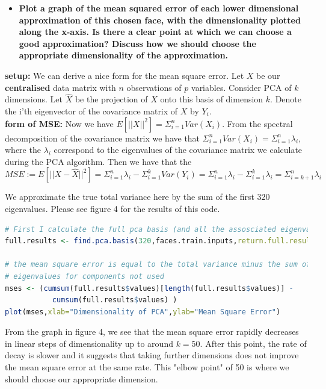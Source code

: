 \documentclass[11pt]{article}
\begin{document}
\begin{itemize}
\item \textbf{Plot a graph of the mean squared error of each lower dimensional approximation of this chosen face, with the dimensionality plotted along the x-axis. Is there a clear point at which we can choose a good approximation? Discuss how we should choose the appropriate dimensionality of the approximation.}
\end{itemize}
\textbf{setup:}
We can derive a nice form for the mean square error. Let $X$ be our \textbf{centralised} data matrix with $n$ observations of $p$ variables. Consider PCA of $k$ dimensions. Let $\hat{X}$ be the projection of $X$ onto this basis of dimension $k$. Denote the i'th eigenvector of the covariance matrix of $X$ by $Y_{i}$. \\
\textbf{form of MSE:}
Now we have $E[||X||^{2}] = \Sigma_{i=1}^{n} Var(X_{i})$. From the spectral decomposition of the covariance matrix we have that $\Sigma_{i=1}^{n} Var(X_{i}) = \Sigma_{i=1}^{n} \lambda_{i}$, where the $\lambda_{i}$ correspond to the eigenvalues of the covariance matrix we calculate during the PCA algorithm. Then we have that the $MSE := E[||X - \hat{X}  ||^{2}] = \Sigma_{i=1}^{n} \lambda_{i} - \Sigma_{i=1}^{k} Var(Y_{i}) =  \Sigma_{i=1}^{n} \lambda_{i} - \Sigma_{i=1}^{k} \lambda_{i} = \Sigma_{i=k+1}^{n} \lambda_{i}$

We approximate the true total variance here by the sum of the first 320 eigenvalues. Please see figure 4 for the results of this code. 

\begin{lstlisting}[linewidth=18.4cm,language=R]
# First I calculate the full pca basis (and all the assosciated eigenvalues)
full.results <- find.pca.basis(320,faces.train.inputs,return.full.results = TRUE)

# the mean square error is equal to the total variance minus the sum of the 
# eigenvalues for components not used 
mses <- (cumsum(full.results$values)[length(full.results$values)] - 
           cumsum(full.results$values) )
plot(mses,xlab="Dimensionality of PCA",ylab="Mean Square Error")
\end{lstlisting}


From the graph in figure 4, we see that the mean square error rapidly decreases in linear steps of dimensionality up to around $k = 50$. After this point, the rate of decay is slower and it suggests that taking further dimensions does not improve the mean square error at the same rate. This "elbow point" of 50 is where we should choose our appropriate dimension.
\end{document}
